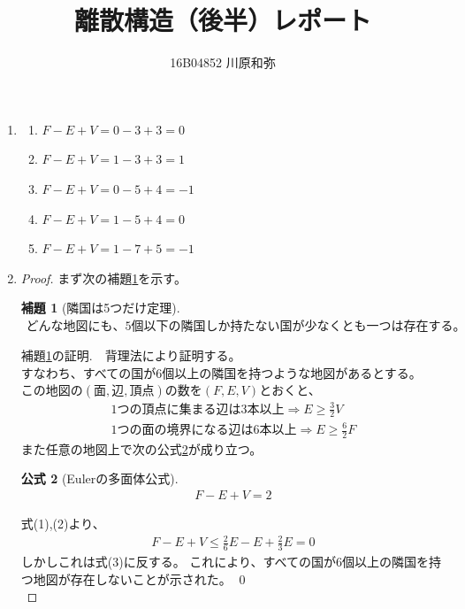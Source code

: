 \documentclass{jsarticle}
\newtheorem{lem}{補題}
\newtheorem{fom}[lem]{公式}
\begin{document}
\title{離散構造（後半）レポート}
\author{16B04852 川原和弥}
\date{}
\maketitle


\begin{enumerate}
\setlength{\itemsep}{0.4cm}

\item
\begin{enumerate}
\renewcommand{\labelenumii}{(\arabic{enumii})}
\item $ F - E + V = 0 - 3 + 3  = 0 $
\item $ F - E + V = 1 - 3 + 3  = 1 $
\item $ F - E + V = 0 - 5 + 4  = -1 $
\item $ F - E + V = 1 - 5 + 4  = 0 $
\item $ F - E + V = 1 - 7 + 5  = -1 $
\end{enumerate}


\item
\begin{proof}

まず次の補題\ref{ringoku}を示す。

\begin{lem}[隣国は5つだけ定理]
\label{ringoku}
\begin{eqnarray} どんな地図にも、5個以下の隣国しか持たない国が少なくとも一つは存在する。 \nonumber \end{eqnarray}
\end{lem}

補題\ref{ringoku}の証明.　背理法により証明する。\\
すなわち、すべての国が6個以上の隣国を持つような地図があるとする。\\
この地図の$(面,辺,頂点)$の数を$(F,E,V)$とおくと、
\begin{eqnarray}
1つの頂点に集まる辺は3本以上 \Rightarrow  E \geq \frac{3}{2} V \\
1つの面の境界になる辺は6本以上 \Rightarrow  E \geq \frac{6}{2} F
\end{eqnarray}
また任意の地図上で次の公式\ref{Euler}が成り立つ。
\begin{fom}[Eulerの多面体公式]
\label{Euler}
\begin{eqnarray} F - E + V = 2 \end{eqnarray}
\end{fom}
式(1),(2)より、
\begin{eqnarray}
F - E + V \leq \frac{2}{6} E - E + \frac{2}{3} E = 0 \nonumber
\end{eqnarray}
しかしこれは式(3)に反する。
これにより、すべての国が6個以上の隣国を持つ地図が存在しないことが示された。
\qed \\


\end{proof}
\end{enumerate}
\end{document}
